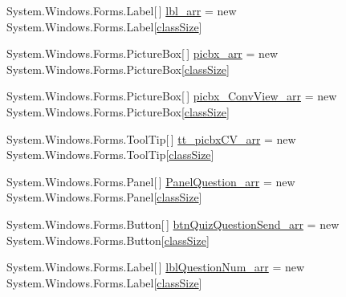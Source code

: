 \begin{DoxyCompactItemize}
\-System.\-Windows.\-Forms.\-Label\mbox{[}$\,$\mbox{]} \hyperlink{class_sr_p___classroom_inq_1_1frm_classrrom_inq_a7f0a5f5fff7a87e841b2793f89dcd997}{lbl\-\_\-arr} = new \-System.\-Windows.\-Forms.\-Label\mbox{[}\hyperlink{class_sr_p___classroom_inq_1_1frm_classrrom_inq_a78d9aab335edfe53d39036b9d89928a8}{class\-Size}\mbox{]}
\item 
\-System.\-Windows.\-Forms.\-Picture\-Box\mbox{[}$\,$\mbox{]} \hyperlink{class_sr_p___classroom_inq_1_1frm_classrrom_inq_a067a85853fc3e38cf6343917c4fb061a}{picbx\-\_\-arr} = new \-System.\-Windows.\-Forms.\-Picture\-Box\mbox{[}\hyperlink{class_sr_p___classroom_inq_1_1frm_classrrom_inq_a78d9aab335edfe53d39036b9d89928a8}{class\-Size}\mbox{]}
\item 
\-System.\-Windows.\-Forms.\-Picture\-Box\mbox{[}$\,$\mbox{]} \hyperlink{class_sr_p___classroom_inq_1_1frm_classrrom_inq_a4d179283a68569b1220534d91ddcf6d1}{picbx\-\_\-\-Conv\-View\-\_\-arr} = new \-System.\-Windows.\-Forms.\-Picture\-Box\mbox{[}\hyperlink{class_sr_p___classroom_inq_1_1frm_classrrom_inq_a78d9aab335edfe53d39036b9d89928a8}{class\-Size}\mbox{]}
\item 
\-System.\-Windows.\-Forms.\-Tool\-Tip\mbox{[}$\,$\mbox{]} \hyperlink{class_sr_p___classroom_inq_1_1frm_classrrom_inq_a2b443a71216ac1b9a63f9db496161a4d}{tt\-\_\-picbx\-C\-V\-\_\-arr} = new \-System.\-Windows.\-Forms.\-Tool\-Tip\mbox{[}\hyperlink{class_sr_p___classroom_inq_1_1frm_classrrom_inq_a78d9aab335edfe53d39036b9d89928a8}{class\-Size}\mbox{]}
\item 
\-System.\-Windows.\-Forms.\-Panel\mbox{[}$\,$\mbox{]} \hyperlink{class_sr_p___classroom_inq_1_1frm_classrrom_inq_a5c89025435cd16c638fbc91999b74f80}{\-Panel\-Question\-\_\-arr} = new \-System.\-Windows.\-Forms.\-Panel\mbox{[}\hyperlink{class_sr_p___classroom_inq_1_1frm_classrrom_inq_a78d9aab335edfe53d39036b9d89928a8}{class\-Size}\mbox{]}
\item 
\-System.\-Windows.\-Forms.\-Button\mbox{[}$\,$\mbox{]} \hyperlink{class_sr_p___classroom_inq_1_1frm_classrrom_inq_a007012d0330b5c8ad6b29271ddefe7f9}{btn\-Quiz\-Question\-Send\-\_\-arr} = new \-System.\-Windows.\-Forms.\-Button\mbox{[}\hyperlink{class_sr_p___classroom_inq_1_1frm_classrrom_inq_a78d9aab335edfe53d39036b9d89928a8}{class\-Size}\mbox{]}
\item 
\-System.\-Windows.\-Forms.\-Label\mbox{[}$\,$\mbox{]} \hyperlink{class_sr_p___classroom_inq_1_1frm_classrrom_inq_ae46e928c386c686caa96bfe4f302c2f1}{lbl\-Question\-Num\-\_\-arr} = new \-System.\-Windows.\-Forms.\-Label\mbox{[}\hyperlink{class_sr_p___classroom_inq_1_1frm_classrrom_inq_a78d9aab335edfe53d39036b9d89928a8}{class\-Size}\mbox{]}

\end{DoxyCompactItemize}
